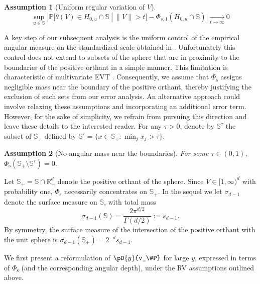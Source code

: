 \documentclass{article}
\numberwithin{equation}{section}
\newtheorem{assumption}{Assumption}[section]
\renewcommand{\P}{\mathbb{P}}
\newcommand{\rset}{\mathbb{R}}
\newcommand{\PP}{\P}%
\newcommand{\sphere}{\mathbb{S}}
\newcommand{\tto}{\xrightarrow[t\to\infty]{}}
\newcommand{\coD}[2]{\pD{#1}{#2}}
\newcommand{\Phitrad}{\Phi_{\mathrm{s}}} %
\newcommand{\Phisprob}{\Phi_{s,1}} %
\begin{document}
 \begin{assumption}[Uniform regular variation of $V$]\label{as:V_uniform_rv}
  $$
\sup_{u\in\sphere} | \PP[\theta(V)  \in H_{0,u}\cap \sphere~|~\| V \|>t] - \Phisprob( H_{0,u}\cap \sphere) | \tto 0
$$
\end{assumption}



A key step of our subsequent analysis is the uniform control of the empirical angular measure on the standardized scale obtained  in \cite{ClemenconJalalzaiSabourinSegers2023}. Unfortunately this control does not extend to subsets of the sphere that are in proximity to the boundaries of the positive orthant in a simple manner. This limitation is characteristic of multivariate EVT \citep{einmahl2001nonparametric,einmahl2009maximum,ClemenconJalalzaiSabourinSegers2023}. Consequently, we assume that $\Phitrad$ assigns negligible mass near the boundary of the positive orthant, thereby justifying the exclusion of such sets from our error analysis. An alternative approach could involve relaxing these assumptions and incorporating an additional error term. However, for the sake of simplicity, we refrain from pursuing this direction and leave  these details to the interested reader. 
  For any $\tau>0$, denote by $\sphere^\tau$ the subset of $\sphere_+$ defined by $ \sphere^\tau= \{ x \in \sphere_+: \min_j x_j > \tau \} $. 
\begin{assumption}[No angular mass near the boundaries]\label{as:nomass-near-boundaries}
  For some $\tau \in (0,1)$, $\Phitrad(\sphere_+\setminus\sphere^\tau) = 0$. 
\end{assumption}
Let $\sphere_+ = \sphere\cap\rset_+^d$ denote the positive orthant of the sphere. Since $V\in[1,\infty)^d$ with probability one, $\Phitrad$ necessarily concentrates on $\sphere_+$. In the sequel we let $\sigma_{d-1}$ denote the surface measure on $\sphere$, with total mass
\begin{equation}\label{eq:surface_measure_sphere}
\sigma_{d-1}(\sphere) = \frac{2 \pi^{d/2} }{\Gamma(d/2)} :=s_{d-1}. 
\end{equation}
By symmetry, the surface measure of the intersection of the positive orthant with the unit sphere is $\sigma_{d-1}(\sphere_+) = 2^{-d}s_{d-1}$.
\medskip

We first present a reformulation of $\coD{y}{v_\#P}$ for large $y$, expressed in terms of $\Phitrad$ (and the corresponding angular depth), under the RV assumptions outlined above. 
\end{document}
